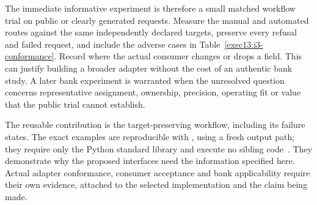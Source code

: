 The immediate informative experiment is therefore a small matched workflow
trial on public or clearly generated requests. Measure the manual and
automated routes against the same independently declared targets, preserve
every refusal and failed request, and include the adverse cases in
Table~\ref{exec13:i3-conformance}. Record where the actual consumer changes
or drops a field. This can justify building a broader adapter without the
cost of an authentic bank study. A later bank experiment is warranted when
the unresolved question concerns representative assignment, ownership,
precision, operating fit or value that the public trial cannot establish.

The reusable contribution is the target-preserving workflow, including its
failure states. The exact examples are reproducible with
, using a fresh output path; they
require only the Python standard library and execute no sibling code~\citep{exec13_i3_examples}. They demonstrate why the proposed interfaces need
the information specified here. Actual adapter conformance, consumer
acceptance and bank applicability require their own evidence, attached to
the selected implementation and the claim being made.



\label{exec13:i3-end}

